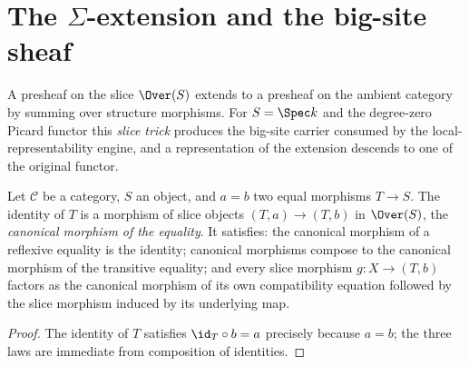 \section{The \texorpdfstring{\(\Sigma\)}{Sigma}-extension and the big-site sheaf}
\label{pa-sec:sigmaExtension}

A presheaf on the slice \(\Over(S)\) extends to a presheaf on the ambient category by
summing over structure morphisms. For \(S = \Spec k\) and the degree-zero Picard functor
this \emph{slice trick} produces the big-site carrier consumed by the local-representability
engine, and a representation of the extension descends to one of the original functor.

\begin{definition}
  \label{pa-def:mkCongr}
  \leanok

  Let \(\mathcal C\) be a category, \(S\) an object, and \(a = b\) two equal morphisms
  \(T \to S\). The identity of \(T\) is a morphism of slice objects
  \((T, a) \to (T, b)\) in \(\Over(S)\), the \emph{canonical morphism of the equality}. It
  satisfies: the canonical morphism of a reflexive equality is the identity; canonical
  morphisms compose to the canonical morphism of the transitive equality; and every slice
  morphism \(g \colon X \to (T, b)\) factors as the canonical morphism of its own
  compatibility equation followed by the slice morphism induced by its underlying map.
\end{definition}
\begin{proof}
  \leanok
  The identity of \(T\) satisfies \(\id_T \circ b = a\) precisely because \(a = b\); the
  three laws are immediate from composition of identities.
\end{proof}

